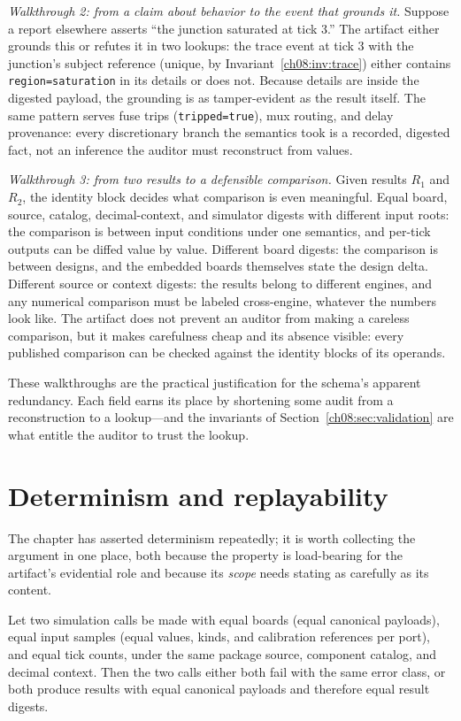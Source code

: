 \emph{Walkthrough 2: from a claim about behavior to the event that grounds it.} Suppose a report elsewhere asserts ``the junction saturated at tick 3.'' The artifact either grounds this or refutes it in two lookups: the trace event at tick 3 with the junction's subject reference (unique, by Invariant~\ref{ch08:inv:trace}) either contains \texttt{region=saturation} in its details or does not. Because details are inside the digested payload, the grounding is as tamper-evident as the result itself. The same pattern serves fuse trips (\texttt{tripped=true}), mux routing, and delay provenance: every discretionary branch the semantics took is a recorded, digested fact, not an inference the auditor must reconstruct from values.

\emph{Walkthrough 3: from two results to a defensible comparison.} Given results $R_1$ and $R_2$, the identity block decides what comparison is even meaningful. Equal board, source, catalog, decimal-context, and simulator digests with different input roots: the comparison is between input conditions under one semantics, and per-tick outputs can be diffed value by value. Different board digests: the comparison is between designs, and the embedded boards themselves state the design delta. Different source or context digests: the results belong to different engines, and any numerical comparison must be labeled cross-engine, whatever the numbers look like. The artifact does not prevent an auditor from making a careless comparison, but it makes carefulness cheap and its absence visible: every published comparison can be checked against the identity blocks of its operands.

These walkthroughs are the practical justification for the schema's apparent redundancy. Each field earns its place by shortening some audit from a reconstruction to a lookup---and the invariants of Section~\ref{ch08:sec:validation} are what entitle the auditor to trust the lookup.

\section{Determinism and replayability}\label{ch08:sec:determinism}

The chapter has asserted determinism repeatedly; it is worth collecting the argument in one place, both because the property is load-bearing for the artifact's evidential role and because its \emph{scope} needs stating as carefully as its content.

\begin{proposition}\label{ch08:prop:determinism}
Let two simulation calls be made with equal boards (equal canonical payloads), equal input samples (equal values, kinds, and calibration references per port), and equal tick counts, under the same package source, component catalog, and decimal context. Then the two calls either both fail with the same error class, or both produce results with equal canonical payloads and therefore equal result digests.
\end{proposition}

